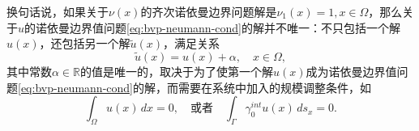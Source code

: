 换句话说，如果关于$\nu(x)$的齐次诺依曼边界问题解是$\nu_1(x)=1, x \in \Omega$，那么关于$u$的诺依曼边界值问题\eqref{eq:bvp-neumann-cond}的解并不唯一：不只包括一个解$u(x)$，还包括另一个解$\tilde{u}(x)$，满足关系
\begin{equation*}
  \tilde{u}(x) = u(x) + \alpha, \quad x \in \Omega,
\end{equation*}
其中常数$\alpha \in \mathbb{R}$的值是唯一的，取决于为了使第一个解$u(x)$成为诺依曼边界值问题\eqref{eq:bvp-neumann-cond}的解，而需要在系统中加入的规模调整条件，如
\begin{equation*}
  \int_{\Omega} u(x) \, dx = 0, \quad \text{或者} \quad \int_{\Gamma} \gamma_0^{int}u(x) \, ds_x =0.
\end{equation*}
